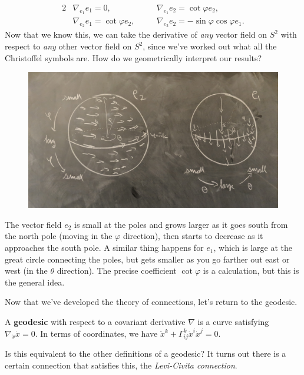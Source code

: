     \begin{alignat*}{2} 
        &\nabla _{e_1}e_1=0,\quad &&\nabla _{e_1}e_2=\cot \varphi e_2,\\
        &\nabla _{e_2}e_1=\cot \varphi  e_2,\quad&&\nabla_{e_2}e_2= - \sin \varphi  \cos \varphi  e_1.
    \end{alignat*}
    Now that we know this, we can take the derivative of \emph{any} vector field on $S^2$ with respect to \emph{any} other vector field on $S^2$, since we've worked out what all the Christoffel symbols are. How do we geometrically interpret our results? 

    \begin{figure}[H]
    \centering
     \includegraphics[width=0.6\linewidth]{figures/rgeo_lec12.1.jpg}
    \end{figure}

    The vector field $e_2$ is small at the poles and grows larger as it goes south from the north pole (moving in the $\varphi $ direction), then starts to decrease as it approaches the south pole. A similar thing happens for $e_1$, which is large at the great circle connecting the poles, but gets smaller as you go farther out east or west (in the $\theta$ direction). The precise coefficient $\cot \varphi $ is a calculation, but this is the general idea. 

    Now that we've developed the theory of connections, let's return to the geodesic.
\begin{definition}[]
    A \textbf{geodesic} with respect to a covariant derivative $\nabla$ is a curve satisfying $\nabla _{\dot x}\dot x=0$. In terms of coordinates, we have $\ddot x^k+\Gamma _{ij}^k \dot x^i \dot x^j =0$.
\end{definition} Is this equivalent to the other definitions of a geodesic? It turns out there is a certain connection that satisfies this, the \emph{Levi-Civita connection}. 

